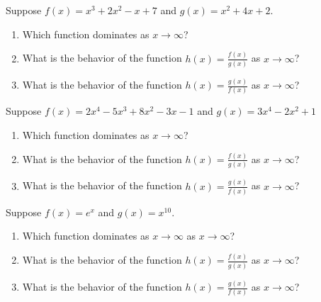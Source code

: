 \begin{activity}\label{A:0.6.4}

	
\ba
		\item Suppose $f(x) = x^{3} + 2x^{2}-x + 7$ and $g(x) = x^{2} + 4x + 2$.  
			\begin{enumerate}
				\item Which function dominates as $x \to \infty$?
				\item What is the behavior of the function $h(x) = \displaystyle{\frac {f(x)}{g(x)}}$ as $x \to \infty$?
				\item What is the behavior of the function $h(x) = \displaystyle{\frac {g(x)}{f(x)}}$ as $x \to \infty$?
			\end{enumerate}
		\item Suppose $f(x) = 2x^{4} - 5x^{3} + 8x^{2} - 3x - 1$ and $g(x) = 3x^{4} - 2x^{2} + 1$
			\begin{enumerate}
				\item Which function dominates as $x \to \infty$?
				\item What is the behavior of the function $h(x) = \displaystyle{\frac {f(x)}{g(x)}}$ as $x \to \infty$?
				\item What is the behavior of the function $h(x) = \displaystyle{\frac {g(x)}{f(x)}}$ as $x \to \infty$?
			\end{enumerate}
        \item Suppose $f(x) = e^{x}$ and $g(x) = x^{10}$.
			\begin{enumerate}
				\item Which function dominates as $x \to \infty$ as $x \to \infty$?
				\item What is the behavior of the function $h(x) = \displaystyle{\frac {f(x)}{g(x)}}$ as $x \to \infty$?
				\item What is the behavior of the function $h(x) = \displaystyle{\frac {g(x)}{f(x)}}$ as $x \to \infty$?
			\end{enumerate}
\ea

\end{activity}\aftera

